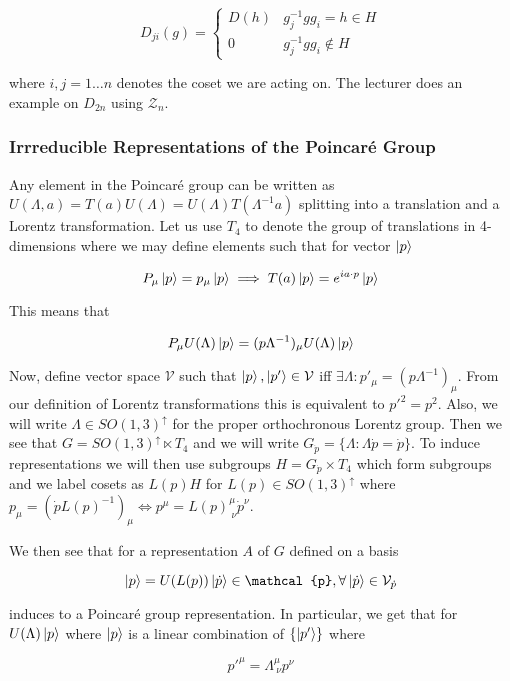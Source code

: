 \documentclass{article}
\theoremstyle{definition}
\begin{document}
$$ D_{ji} (g) =
\begin{cases}
  D(h) & g_j^{-1} g g_i = h \in H \\
  0 & g_j^{-1} g g_i \not \in H
\end{cases} $$

where $i, j = 1 \dots n$ denotes the coset we are acting on. The lecturer does
an example on $D_{2n}$ using $\mathcal{Z}_n$. 

\subsubsection{Irrreducible Representations of the Poincar\'{e} Group}

Any element in the Poincar\'{e} group can be written as $U(\Lambda, a) = T(a)
U(\Lambda) = U(\Lambda) T(\Lambda^{-1} a)$ splitting into a translation and a
Lorentz transformation. Let us use $T_4$ to denote the group of translations in
4-dimensions where we may define elements such that for vector $\ket{p}$

$$ P_\mu \ket{p} = p_\mu \ket{p} \implies T(a) \ket{p} = e^{ia \cdot p}
\ket{p} $$

This means that

$$ P_\mu U(\Lambda) \ket{p} = (p\Lambda^{-1})_\mu U(\Lambda) \ket{p} $$

Now, define vector space $\mathcal{V}$ such that $\ket{p}, \ket{p'} \in
\mathcal{V}$ iff $\exists \Lambda: p'_\mu = (p \Lambda^{-1})_\mu$. From our
definition of Lorentz transformations this is equivalent to $p'^2 = p^2$. Also,
we will write $\Lambda \in SO(1, 3)^\uparrow$ for the proper orthochronous
Lorentz group. Then we see that $G = SO(1, 3)^\uparrow \ltimes T_4$ and we will
write $G_{\dot{p}} = \{\Lambda : \Lambda \dot{p} = \dot{p} \}$. To induce
representations we will then use subgroups $H = G_{\dot{p}} \times T_4$ which
form subgroups and we label cosets as $L(p)H$ for $L(p) \in SO(1, 3)^\uparrow$
where $p_\mu = (\dot{p} L(p)^{-1})_\mu \iff p^\mu = L(p)^\mu_{\ \nu}
\dot{p}^\nu$.

We then see that for a representation $A$ of $G$ defined on a basis

$$ \ket{p} = U(L(p)) \ket{\dot{p}} \in \mathcal{p}, \forall \ket{\dot{p}} \in
\mathcal{V}_{\dot{p}}$$

induces to a Poincar\'{e} group representation. In particular, we get that for
$U(\Lambda) \ket{p}$ where $\ket{p}$ is a linear combination of $\{\ket{p'}\}$
where

$$ p'^\mu = \Lambda^\mu_{\ \nu} p^\nu $$
\end{document}
